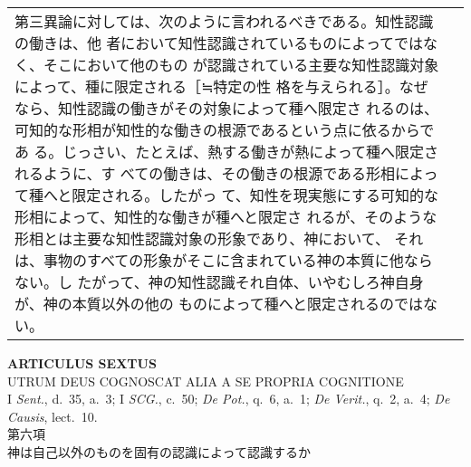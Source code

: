 \documentclass[10pt]{jsarticle} %
\begin{document}
\begin{longtable}{p{21em}p{21em}}
第三異論に対しては、次のように言われるべきである。知性認識の働きは、他
者において知性認識されているものによってではなく、そこにおいて他のもの
が認識されている主要な知性認識対象によって、種に限定される［≒特定の性
格を与えられる］。なぜなら、知性認識の働きがその対象によって種へ限定さ
れるのは、可知的な形相が知性的な働きの根源であるという点に依るからであ
る。じっさい、たとえば、熱する働きが熱によって種へ限定されるように、す
べての働きは、その働きの根源である形相によって種へと限定される。したがっ
て、知性を現実態にする可知的な形相によって、知性的な働きが種へと限定さ
れるが、そのような形相とは主要な知性認識対象の形象であり、神において、
それは、事物のすべての形象がそこに含まれている神の本質に他ならない。し
たがって、神の知性認識それ自体、いやむしろ神自身が、神の本質以外の他の
ものによって種へと限定されるのではない。


\end{longtable}
\newpage


\begin{center}
{\Large {\bf ARTICULUS SEXTUS}}\\ {\large UTRUM DEUS COGNOSCAT ALIA A
SE PROPRIA COGNITIONE}\\ {\footnotesize I {\itshape Sent.}, d.~35,
a.~3; I {\itshape SCG.}, c.~50; {\itshape De Pot.}, q.~6, a.~1;
{\itshape De Verit.}, q.~2, a.~4; {\itshape De Causis}, lect.~10.}\\
{\Large 第六項\\神は自己以外のものを固有の認識によって認識するか}
\end{center}
\end{document}
